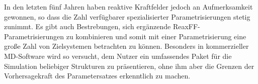 In den letzten fünf Jahren haben reaktive Kraftfelder jedoch an Aufmerksamkeit gewonnen, so dass die Zahl verfügbarer spezialisierter Parametrisierungen stetig zunimmt.
Es gibt auch Bestrebungen, sich ergänzende ReaxFF-Parametrisierungen zu kombinieren und somit mit einer Parametrisierung eine große Zahl von Zielsystemen betrachten zu können.
Besonders in kommerzieller MD-Software\cite{biovia_materials_2014} wird so versucht, dem Nutzer ein umfassendes Paket für die Simulation beliebiger Strukturen zu präsentieren, ohne ihm aber die Grenzen der Vorhersagekraft des Parametersatzes erkenntlich zu machen.
